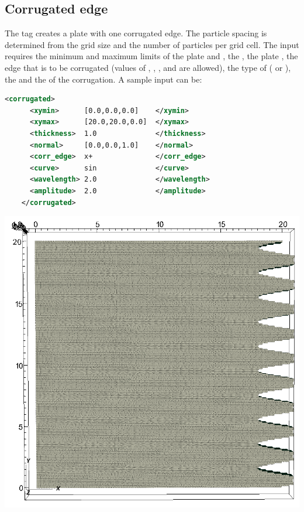 \subsection{Corrugated edge}
\begin{minipage}[t]{0.6\textwidth}
  \vspace{0pt}
  The  tag creates a plate with one corrugated edge.  The particle spacing
  is determined from the grid size and the number of particles per grid cell.
  The input requires the minimum and maximum limits of the plate  and
  , the , the plate , the 
   edge that is to be corrugated (values of , ,
  , and  are allowed), the type of  (
  or ), the  and the  of the 
  corrugation.  A sample input can be:
  \begin{lstlisting}[language=XML]
    <corrugated> 
      <xymin>      [0.0,0.0,0.0]    </xymin> 
      <xymax>      [20.0,20.0,0.0]  </xymax> 
      <thickness>  1.0              </thickness>
      <normal>     [0.0,0.0,1.0]    </normal>
      <corr_edge>  x+               </corr_edge>
      <curve>      sin              </curve>
      <wavelength> 2.0              </wavelength>
      <amplitude>  2.0              </amplitude>
    </corrugated>
  \end{lstlisting}
\end{minipage}
\hspace{12pt}
\begin{minipage}[t]{0.35\textwidth}
  \vspace{0pt}
  \centering
  \includegraphics[width=0.7\columnwidth]{FIGS/geometry/geom_corrug.png}
\end{minipage}

